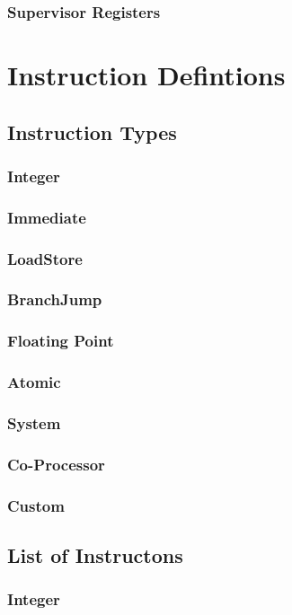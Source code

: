 \documentclass[letterpaper]{article}
\begin{document}
\subsubsection{Supervisor Registers}


\section{Instruction Defintions}
\subsection{Instruction Types}
\subsubsection{Integer}
\subsubsection{Immediate}
\subsubsection{Load\/Store}
\subsubsection{Branch\/Jump}
\subsubsection{Floating Point}
\subsubsection{Atomic}
\subsubsection{System}
\subsubsection{Co-Processor}
\subsubsection{Custom}
\subsection{List of Instructons}
\subsubsection{Integer}
\end{document}
